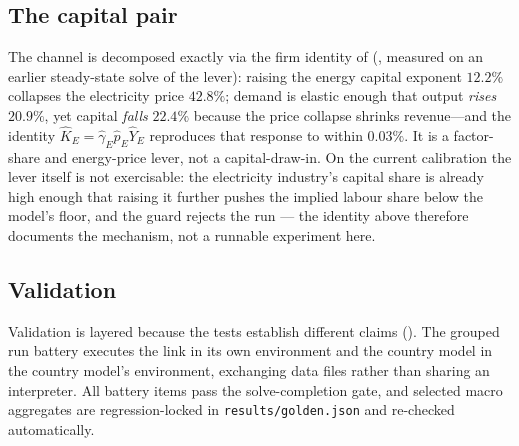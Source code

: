 \subsection{The capital pair}
\label{sec:capital-results}
The  channel is decomposed exactly via the firm identity of
 (, measured on an earlier steady-state solve
of the lever): raising the energy capital exponent
$12.2\%$ collapses the electricity price $42.8\%$; demand is elastic enough that output
\emph{rises} $20.9\%$, yet capital \emph{falls} $22.4\%$ because the price collapse shrinks
revenue---and the identity $\hat K_E=\hat\gamma_E\hat p_E\hat Y_E$ reproduces that response
to within $0.03\%$. It is a factor-share and energy-price lever, not a capital-draw-in.
On the current calibration the lever itself is not exercisable: the electricity
industry's capital share is already high enough that raising it further pushes the
implied labour share below the model's floor, and the guard rejects the run --- the
identity above therefore documents the mechanism, not a runnable experiment here.

\subsection{Validation}
\label{sec:validation}
Validation is layered because the tests establish different claims
(). The grouped run battery executes the link in its own
environment and the country \OGCore{} model in the country model's environment,
exchanging data files rather than sharing an interpreter. All battery items pass the
solve-completion gate, and selected macro aggregates are regression-locked in
\texttt{results/golden.json} and re-checked automatically.


